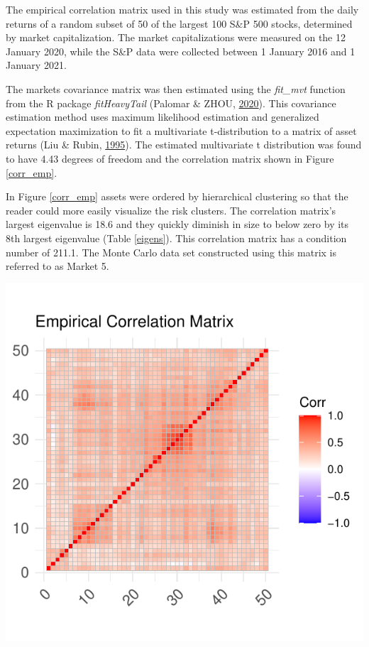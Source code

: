 \documentclass[11pt,preprint, authoryear]{elsarticle}
\let\origfigure\figure
\let\endorigfigure\endfigure
\renewenvironment{figure}[1][2] {
    \expandafter\origfigure\expandafter[H]
} {
    \endorigfigure
}
\numberwithin{equation}{section}
\numberwithin{figure}{section}
\numberwithin{table}{section}
\begin{document}
The empirical correlation matrix used in this study was estimated from
the daily returns of a random subset of 50 of the largest 100 S\&P 500
stocks, determined by market capitalization. The market capitalizations
were measured on the 12 January 2020, while the S\&P data were collected
between 1 January 2016 and 1 January 2021.

The markets covariance matrix was then estimated using the
\emph{fit\_mvt} function from the R package \emph{fitHeavyTail} (Palomar
\& ZHOU, \protect\hyperlink{ref-fitHeavyTail}{2020}). This covariance
estimation method uses maximum likelihood estimation and generalized
expectation maximization to fit a multivariate t-distribution to a
matrix of asset returns (Liu \& Rubin,
\protect\hyperlink{ref-liu1995}{1995}). The estimated multivariate t
distribution was found to have 4.43 degrees of freedom and the
correlation matrix shown in Figure \ref{corr_emp}.

In Figure \ref{corr_emp} assets were ordered by hierarchical clustering
so that the reader could more easily visualize the risk clusters. The
correlation matrix's largest eigenvalue is 18.6 and they quickly
diminish in size to below zero by its 8th largest eigenvalue (Table
\ref{eigens}). This correlation matrix has a condition number of 211.1.
The Monte Carlo data set constructed using this matrix is referred to as
Market 5.

\begin{figure}
\centering
\includegraphics{Thesis_files/figure-latex/unnamed-chunk-1-1.pdf}
\caption{\label{corr_emp} Empirical Correlation Matrix}
\end{figure}
\end{document}
